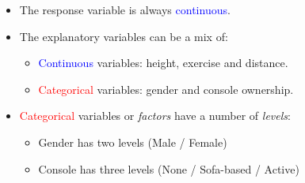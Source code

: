 \documentclass[aspectratio=43]{beamer}
\begin{document}
\begin{frame}[t]
\begin{center}
\begin{tikzpicture}
\end{tikzpicture}

\begin{itemize}
\item The response variable is always \textcolor{blue}{continuous}.
\item The explanatory variables can be a mix of:
\begin{itemize}
\item \textcolor{blue}{Continuous} variables: height, exercise and distance.
\item \textcolor{red}{Categorical} variables: gender and console ownership.
\end{itemize}
\item \textcolor{red}{Categorical} variables or {\it factors} have a number of {\it levels}:
\begin{itemize}
\item Gender has two levels (Male / Female)
\item Console has three levels (None / Sofa-based / Active)
\end{itemize}
\end{itemize}
\end{center}
\end{frame}
\end{document}
